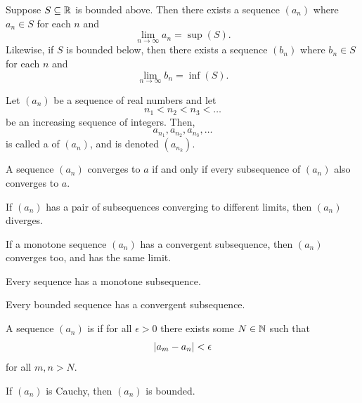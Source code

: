 \documentclass[11pt,twoside=off,numbers=noenddot]{scrbook}
\begin{document}
\begin{proposition}
    Suppose $S \subseteq \mathbb R$ is bounded above. Then there exists a sequence $(a_n)$ where $a_n \in S$ for each $n$ and
    \[ \lim_{n \to \infty} a_n = \sup(S). \]
    Likewise, if $S$ is bounded below, then there exists a sequence $(b_n)$ where $b_n \in S$ for each $n$ and
    \[ \lim_{n \to \infty} b_n = \inf(S). \]
\end{proposition}

\begin{definition}
    Let $(a_n)$ be a sequence of real numbers and let
    \[ n_1 < n_2 < n_3 < \dots \]
    be an increasing sequence of integers. Then,
    \[ a_{n_1}, a_{n_2}, a_{n_3}, \dots \]
    is called a  of $(a_n)$, and is denoted $(a_{n_k})$.
\end{definition}

\begin{proposition}
    A sequence $(a_n)$ converges to $a$ if and only if every subsequence of $(a_n)$ also converges to $a$.
\end{proposition}

\begin{corollary}
    If $(a_n)$ has a pair of subsequences converging to different limits, then $(a_n)$ diverges.
\end{corollary}

\begin{proposition}
    If a monotone sequence $(a_n)$ has a convergent subsequence, then $(a_n)$ converges too, and has the same limit.
\end{proposition}

\begin{lemma}
    Every sequence has a monotone subsequence.
\end{lemma}

\begin{theorem}
    Every bounded sequence has a convergent subsequence.
\end{theorem}

\begin{definition}
    A sequence $(a_n)$ is  if for all $\epsilon > 0$ there exists some $N \in \mathbb N$ such that
    \[ | a_m - a_n | < \epsilon \]
    for all $m, n > N$.
\end{definition}

\begin{lemma}
    If $(a_n)$ is Cauchy, then $(a_n)$ is bounded.
\end{lemma}
\end{document}
